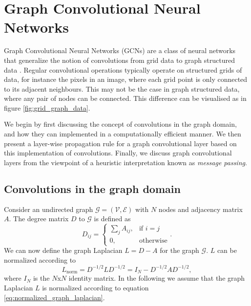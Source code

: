 


\section{Graph Convolutional Neural Networks}

Graph Convolutional Neural Networks (GCNs) are a class of neural networks that generalize the notion of convolutions from grid data to graph structured data \cite{wu_review}. Regular convolutional operations typically operate on structured grids of data, for instance the pixels in an image, where each grid point is only connected to its adjacent neighbours. This may not be the case in graph structured data, where any pair of nodes can be connected. This difference can be visualised as in figure \ref{fig:grid_graph_data}. 

We begin by first discussing the concept of convolutions in the graph domain, and how they can implemented in a computationally efficient manner. We then present a layer-wise propagation rule for a graph convolutional layer based on this implementation of convolutions. Finally, we discuss graph convolutional layers from the viewpoint of a heuristic interpretation known as \textit{message passing}.

\subsection{Convolutions in the graph domain}

Consider an undirected graph $\mathcal{G} = (\mathcal{V}, \mathcal{E})$ with $N$ nodes and adjacency matrix $A$. The degree matrix $D$ to $\mathcal{G}$ is defined as 
\begin{equation}
    D_{ij} = \begin{cases} \sum_j A_{ij}, & \mbox{if } i = j \\ \mbox{0,} & \mbox{otherwise} \end{cases}.
    \label{eq:degreematrixdefinition}
\end{equation}
We can now define the graph Laplacian $L= D-A $ for the graph $\mathcal{G}$. $L$ can be normalized according to 
\begin{equation}
    L_\text{norm} = D^{-1/2} L D^{-1/2} =  I_N - D^{-1/2} A D^{-1/2},
    \label{eq:normalized_graph_laplacian}
\end{equation}
where $I_N$ is the $N$x$N$ identity matrix. In the following we assume that the graph Laplacian $L$ is normalized according to equation \eqref{eq:normalized_graph_laplacian}.

